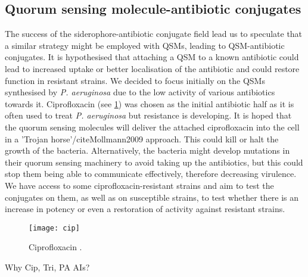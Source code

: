\subsection{Quorum sensing molecule-antibiotic conjugates}

The success of the siderophore-antibiotic conjugate field lead us to speculate that a similar strategy might be employed with QSMs, leading to QSM-antibiotic conjugates. It is hypothesised that attaching a QSM to a known antibiotic could lead to increased uptake or better localisation of the antibiotic and could restore function in resistant strains. We decided to focus initially on the QSMs synthesised by \textit{P. aeruginosa} due to the low activity of various antibiotics towards it. Ciprofloxacin  (see \ref{fgr:cip}) was chosen as the initial antibiotic half as it is often used to treat \textit{P. aeruginosa}\cite{Macgowan1999} but resistance is developing\cite{Su2010}. It is hoped that the quorum sensing molecules will deliver the attached ciprofloxacin into the cell in a 'Trojan horse'/cite{Mollmann2009} approach. This could kill or halt the growth of the bacteria. Alternatively, the bacteria might develop mutations in their quorum sensing machinery to avoid taking up the antibiotics, but this could stop them being able to communicate effectively, therefore decreasing virulence. 
We have access to some ciprofloxacin-resistant strains and aim to test the conjugates on them, as well as on susceptible strains, to test whether there is an increase in potency or even a restoration of activity against resistant strains. 


\begin{figure}[H]
	\begin{center}
		\texttt{[image: cip]}
		\caption{Ciprofloxacin . \label{fgr:cip}}
	\end{center}
\end{figure}

Why Cip, Tri, PA AIs?

